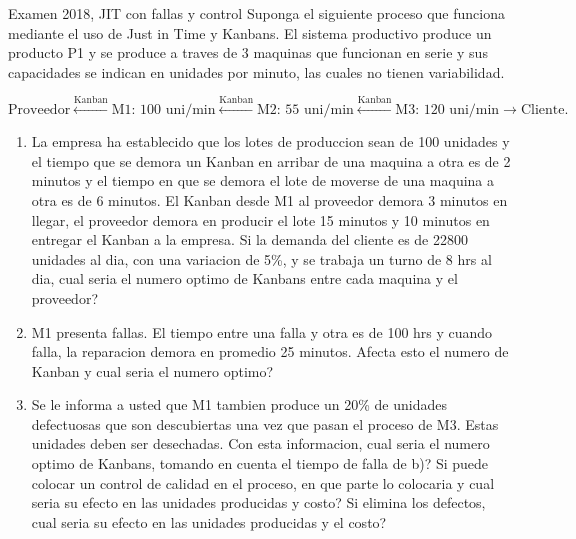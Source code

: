 \begin{enunciado}{Examen 2018, JIT con fallas y control}
Suponga el siguiente proceso que funciona mediante el uso de Just in Time y Kanbans. El sistema productivo produce un producto P1 y se produce a traves de 3 maquinas que funcionan en serie y sus capacidades se indican en unidades por minuto, las cuales no tienen variabilidad.

\[
  \text{Proveedor}
  \xleftarrow{\text{Kanban}}
  \text{M1: 100 uni/min}
  \xleftarrow{\text{Kanban}}
  \text{M2: 55 uni/min}
  \xleftarrow{\text{Kanban}}
  \text{M3: 120 uni/min}
  \rightarrow
  \text{Cliente}.
\]

\begin{enumerate}[label=\alph*)]
  \item La empresa ha establecido que los lotes de produccion sean de 100 unidades y el tiempo que se demora un Kanban en arribar de una maquina a otra es de 2 minutos y el tiempo en que se demora el lote de moverse de una maquina a otra es de 6 minutos. El Kanban desde M1 al proveedor demora 3 minutos en llegar, el proveedor demora en producir el lote 15 minutos y 10 minutos en entregar el Kanban a la empresa. Si la demanda del cliente es de 22800 unidades al dia, con una variacion de 5\%, y se trabaja un turno de 8 hrs al dia, cual seria el numero optimo de Kanbans entre cada maquina y el proveedor?
  \item M1 presenta fallas. El tiempo entre una falla y otra es de 100 hrs y cuando falla, la reparacion demora en promedio 25 minutos. Afecta esto el numero de Kanban y cual seria el numero optimo?
  \item Se le informa a usted que M1 tambien produce un 20\% de unidades defectuosas que son descubiertas una vez que pasan el proceso de M3. Estas unidades deben ser desechadas. Con esta informacion, cual seria el numero optimo de Kanbans, tomando en cuenta el tiempo de falla de b)? Si puede colocar un control de calidad en el proceso, en que parte lo colocaria y cual seria su efecto en las unidades producidas y costo? Si elimina los defectos, cual seria su efecto en las unidades producidas y el costo?
\end{enumerate}
\end{enunciado}

